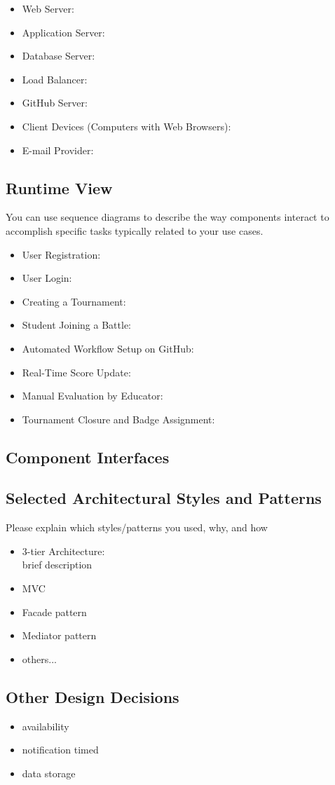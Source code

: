 \begin{itemize}
    \item Web Server:
    \item Application Server:
    \item Database Server:
    \item Load Balancer:
    \item GitHub Server:
    \item Client Devices (Computers with Web Browsers):
    \item E-mail Provider:
\end{itemize}

\subsection{Runtime View}
 You can use sequence diagrams to describe the way components interact to accomplish specific tasks typically related to your use cases.

 \begin{itemize}
    \item User Registration:
    \item User Login:
    \item Creating a Tournament:
    \item Student Joining a Battle:
    \item Automated Workflow Setup on GitHub:
    \item Real-Time Score Update:
    \item Manual Evaluation by Educator:
    \item Tournament Closure and Badge Assignment:
\end{itemize}

 \subsection{Component Interfaces}

 \subsection{Selected Architectural Styles and Patterns}
Please explain which styles/patterns you used, why, and how 
\begin{itemize}
    \item 3-tier Architecture: \\
    brief description
    \item MVC 
    \item  Facade pattern
    \item Mediator pattern
    \item others...
\end{itemize}

\subsection{Other Design Decisions}
\begin{itemize}
    \item availability
    \item notification timed
    \item  data storage
\end{itemize}